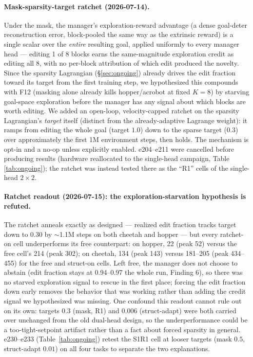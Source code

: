 \documentclass[10pt]{article}
\begin{document}
\paragraph{Mask-sparsity-target ratchet (2026-07-14).}
\label{sec:ratchet}
Under the mask, the manager's exploration-reward advantage (a dense goal-deter
reconstruction error, block-pooled the same way as the extrinsic reward) is a
single scalar over the \emph{entire} resulting goal, applied uniformly to
every manager head --- editing 1 of 8 blocks earns the same-magnitude
exploration credit as editing all 8, with no per-block attribution of which
edit produced the novelty. Since the sparsity Lagrangian (\S\ref{sec:ongoing})
already drives the edit fraction toward its target from the first training
step, we hypothesized this compounds with F12 (masking alone already kills
hopper/acrobot at fixed $K{=}8$) by starving goal-space exploration before the
manager has any signal about which blocks are worth editing. We added an
open-loop, velocity-capped ratchet on the sparsity Lagrangian's \emph{target}
itself (distinct from the already-adaptive Lagrange weight): it ramps from
editing the whole goal (target $1.0$) down to the sparse target ($0.3$) over
approximately the first 1M environment steps, then holds. The mechanism is
opt-in and a no-op unless explicitly enabled. e204--e211 were cancelled before
producing results (hardware reallocated to the single-head campaign, Table
\ref{tab:ongoing}); the ratchet was instead tested there as the ``R1'' cells
of the single-head $2{\times}2$.

\paragraph{Ratchet readout (2026-07-15): the exploration-starvation hypothesis
is refuted.} The ratchet anneals exactly as designed --- realized edit
fraction tracks target down to 0.30 by $\sim$1.1M steps on both cheetah and
hopper --- but every ratchet-on cell underperforms its free counterpart: on
hopper, 22 (peak 52) versus the free cell's 214 (peak 302); on cheetah, 134
(peak 143) versus 181--205 (peak 434--455) for the free and struct-on cells.
Left free, the manager does not choose to abstain (edit fraction stays at
0.94--0.97 the whole run, Finding 6), so there was no starved exploration
signal to rescue in the first place; forcing the edit fraction down early
removes the behavior that was working rather than adding the credit signal
we hypothesized was missing. One confound this readout cannot rule out on its
own: targets 0.3 (mask, R1) and 0.006 (struct-adapt) were both carried over
unchanged from the old dual-head design, so the underperformance could be a
too-tight-setpoint artifact rather than a fact about forced sparsity in
general. e230--e233 (Table~\ref{tab:ongoing}) retest the S1R1 cell at looser
targets (mask $0.5$, struct-adapt $0.01$) on all four tasks to separate the
two explanations.
\end{document}
